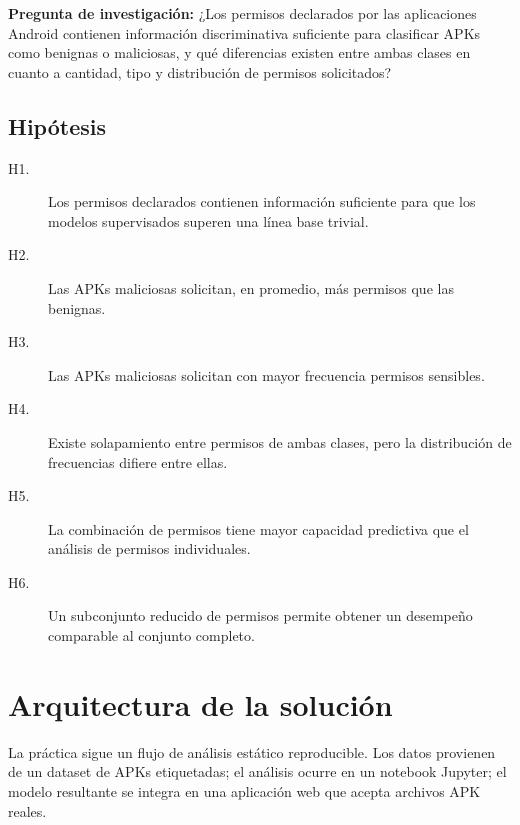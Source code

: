 \documentclass[
  coursetitle={Cómputo Nube y Tecnologías Emergentes},
  coursehours={96},
  coursedate={Verano 2026},
  doctype={Tutorial},
  otherlangs={english,french},
  authorname={Lázaro},
  authorsurname={Bustio-Martínez},
  authortitle={PhD},
  role={Profesor Investigador},
  email={lbustio@inaoe.mx},
  phone={5559504000},
  ext={7459},
  institution={Instituto Nacional de Astrofísica, Óptica y Electrónica (INAOE)},
  department={Maestría en Ciencias en Tecnologías de Seguridad},
  address={Luis Enrique Erro 1, Sta. Ma. Tonantzintla, San Andrés Cholula, CP 72840, Puebla, México},
  margin={0.5in}
]{../../lbustio_lecture_notes}
\begin{document}
\textbf{Pregunta de investigación:} ¿Los permisos declarados por las aplicaciones Android contienen información discriminativa suficiente para clasificar APKs como benignas o maliciosas, y qué diferencias existen entre ambas clases en cuanto a cantidad, tipo y distribución de permisos solicitados?

\subsection{Hipótesis}

\begin{description}
    \item[H1.] Los permisos declarados contienen información suficiente para que los modelos supervisados superen una línea base trivial.
    \item[H2.] Las APKs maliciosas solicitan, en promedio, más permisos que las benignas.
    \item[H3.] Las APKs maliciosas solicitan con mayor frecuencia permisos sensibles.
    \item[H4.] Existe solapamiento entre permisos de ambas clases, pero la distribución de frecuencias difiere entre ellas.
    \item[H5.] La combinación de permisos tiene mayor capacidad predictiva que el análisis de permisos individuales.
    \item[H6.] Un subconjunto reducido de permisos permite obtener un desempeño comparable al conjunto completo.
\end{description}

\section{Arquitectura de la solución}

La práctica sigue un flujo de análisis estático reproducible. Los datos provienen de un dataset de APKs etiquetadas; el análisis ocurre en un notebook Jupyter; el modelo resultante se integra en una aplicación web que acepta archivos APK reales.
\end{document}

